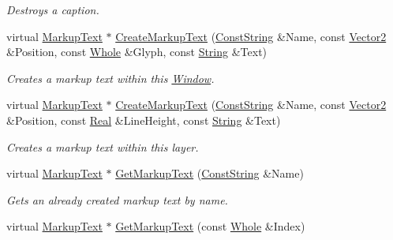 \begin{DoxyCompactItemize}
\begin{DoxyCompactList}\small\item\em Destroys a caption. \item\end{DoxyCompactList}\item 
virtual \hyperlink{classphys_1_1UI_1_1MarkupText}{MarkupText} $\ast$ \hyperlink{classphys_1_1UI_1_1Window_a787900381ca55a3c452b59666717b6f4}{CreateMarkupText} (\hyperlink{namespacephys_a5ce5049f8b4bf88d6413c47b504ebb31}{ConstString} \&Name, const \hyperlink{classphys_1_1Vector2}{Vector2} \&Position, const \hyperlink{namespacephys_a460f6bc24c8dd347b05e0366ae34f34a}{Whole} \&Glyph, const \hyperlink{namespacephys_aa03900411993de7fbfec4789bc1d392e}{String} \&Text)
\begin{DoxyCompactList}\small\item\em Creates a markup text within this \hyperlink{classphys_1_1UI_1_1Window}{Window}. \item\end{DoxyCompactList}\item 
virtual \hyperlink{classphys_1_1UI_1_1MarkupText}{MarkupText} $\ast$ \hyperlink{classphys_1_1UI_1_1Window_af8fd997dfd4469537180b42e2ebdf748}{CreateMarkupText} (\hyperlink{namespacephys_a5ce5049f8b4bf88d6413c47b504ebb31}{ConstString} \&Name, const \hyperlink{classphys_1_1Vector2}{Vector2} \&Position, const \hyperlink{namespacephys_af7eb897198d265b8e868f45240230d5f}{Real} \&LineHeight, const \hyperlink{namespacephys_aa03900411993de7fbfec4789bc1d392e}{String} \&Text)
\begin{DoxyCompactList}\small\item\em Creates a markup text within this layer. \item\end{DoxyCompactList}\item 
virtual \hyperlink{classphys_1_1UI_1_1MarkupText}{MarkupText} $\ast$ \hyperlink{classphys_1_1UI_1_1Window_af5bf2246915fc68558d2a68ed016a68b}{GetMarkupText} (\hyperlink{namespacephys_a5ce5049f8b4bf88d6413c47b504ebb31}{ConstString} \&Name)
\begin{DoxyCompactList}\small\item\em Gets an already created markup text by name. \item\end{DoxyCompactList}\item 
virtual \hyperlink{classphys_1_1UI_1_1MarkupText}{MarkupText} $\ast$ \hyperlink{classphys_1_1UI_1_1Window_a7f9a97e3f8c70b0a7917a7768e5d53aa}{GetMarkupText} (const \hyperlink{namespacephys_a460f6bc24c8dd347b05e0366ae34f34a}{Whole} \&Index)

\end{DoxyCompactItemize}
